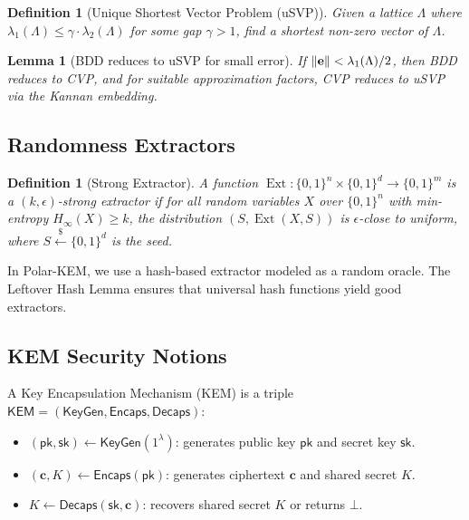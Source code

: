 \documentclass[11pt,a4paper]{article}
\newtheorem{lemma}[theorem]{Lemma}
\newtheorem{definition}[theorem]{Definition}
\newcommand{\polarKem}{\textsf{Polar-KEM}\xspace}
\newcommand{\BDD}{\textsf{BDD}\xspace}
\newcommand{\CVP}{\textsf{CVP}\xspace}
\newcommand{\usvp}{\textsf{uSVP}\xspace}
\newcommand{\bit}{\{0,1\}}
\newcommand{\sample}{\xleftarrow{\$}}
\DeclareMathOperator{\Ext}{Ext}
\newcommand{\pk}{\mathsf{pk}}
\newcommand{\sk}{\mathsf{sk}}
\DeclarePairedDelimiter{\norm}{\lVert}{\rVert}
\begin{document}
\begin{definition}[Unique Shortest Vector Problem (\usvp)]\label{def:usvp}
Given a lattice $\Lambda$ where $\lambda_1(\Lambda) \leq \gamma \cdot \lambda_2(\Lambda)$ for some gap $\gamma > 1$, find a shortest non-zero vector of $\Lambda$.
\end{definition}

\begin{lemma}[BDD reduces to \usvp for small error]\label{lem:bdd-usvp}
If $\norm{\mathbf{e}} < \lambda_1(\Lambda) / 2$, then \BDD reduces to \CVP, and for suitable approximation factors, \CVP reduces to \usvp via the Kannan embedding.
\end{lemma}

\subsection{Randomness Extractors}\label{sec:extractors}

\begin{definition}[Strong Extractor]\label{def:extractor}
A function $\Ext: \bit^n \times \bit^d \to \bit^m$ is a \emph{$(k, \epsilon)$-strong extractor} if for all random variables $X$ over $\bit^n$ with min-entropy $H_\infty(X) \geq k$, the distribution $(S, \Ext(X, S))$ is $\epsilon$-close to uniform, where $S \sample \bit^d$ is the seed.
\end{definition}

In \polarKem, we use a hash-based extractor modeled as a random oracle. The Leftover Hash Lemma ensures that universal hash functions yield good extractors.

\subsection{KEM Security Notions}\label{sec:security-notions}

A Key Encapsulation Mechanism (KEM) is a triple $\mathsf{KEM} = (\mathsf{KeyGen}, \mathsf{Encaps}, \mathsf{Decaps})$:

\begin{itemize}[leftmargin=2em]
\item $(\pk, \sk) \gets \mathsf{KeyGen}(1^\lambda)$: generates public key $\pk$ and secret key $\sk$.
\item $(\mathbf{c}, K) \gets \mathsf{Encaps}(\pk)$: generates ciphertext $\mathbf{c}$ and shared secret $K$.
\item $K \gets \mathsf{Decaps}(\sk, \mathbf{c})$: recovers shared secret $K$ or returns $\bot$.
\end{itemize}
\end{document}

